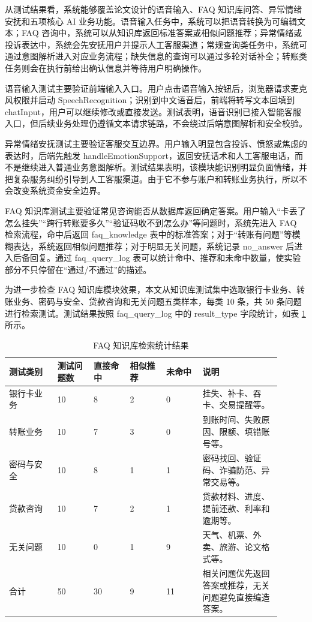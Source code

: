 \documentclass[bachelor, print]{xduthesis}
\begin{document}
从测试结果看，系统能够覆盖论文设计的语音输入、FAQ 知识库问答、异常情绪安抚和五项核心 AI 业务功能。语音输入任务中，系统可以把语音转换为可编辑文本；FAQ 咨询中，系统可以从知识库返回标准答案或相似问题推荐；异常情绪或投诉表达中，系统会先安抚用户并提示人工客服渠道；常规查询类任务中，系统可通过意图解析进入对应业务流程；缺失信息的查询可以通过多轮对话补全；转账类任务则会在执行前给出确认信息并等待用户明确操作。

语音输入测试主要验证前端输入入口。用户点击语音输入按钮后，浏览器请求麦克风权限并启动 SpeechRecognition；识别到中文语音后，前端将转写文本回填到 chatInput，用户可以继续修改或直接发送。测试表明，语音识别已接入智能客服入口，但后续业务处理仍遵循文本请求链路，不会绕过后端意图解析和安全校验。

异常情绪安抚测试主要验证客服交互边界。用户输入明显包含投诉、愤怒或焦虑的表达时，后端先触发 handleEmotionSupport，返回安抚话术和人工客服电话，而不是继续进入普通业务意图解析。测试结果表明，该模块能识别明显负面情绪，并把复杂服务纠纷引导到人工客服渠道。由于它不参与账户和转账业务执行，所以不会改变系统资金安全边界。

FAQ 知识库测试主要验证常见咨询能否从数据库返回确定答案。用户输入“卡丢了怎么挂失”“跨行转账要多久”“验证码收不到怎么办”等问题时，系统先进入 FAQ 检索流程，命中后返回 faq\_knowledge 表中的标准答案；对于“转账有问题”等模糊表达，系统返回相似问题推荐；对于明显无关问题，系统记录 no\_answer 后进入后备回复。通过 faq\_query\_log 表可以统计命中、推荐和未命中数量，使实验部分不只停留在“通过/不通过”的描述。

为进一步检查 FAQ 知识库模块效果，本文从知识库测试集中选取银行卡业务、转账业务、密码与安全、贷款咨询和无关问题五类样本，每类 10 条，共 50 条问题进行检索测试。测试结果按照 faq\_query\_log 中的 result\_type 字段统计，如表 \ref{tab:faq-knowledge-stat} 所示。

\begin{table}[H]
    \centering
    \caption{FAQ 知识库检索统计结果}
    \label{tab:faq-knowledge-stat}
    \small
    \setlength{\tabcolsep}{3pt}
    \begin{tabular}{|p{0.16\linewidth}|p{0.12\linewidth}|p{0.12\linewidth}|p{0.12\linewidth}|p{0.12\linewidth}|p{0.26\linewidth}|}
        \hline
        测试类别 & 测试问题数 & 直接命中 & 相似推荐 & 未命中 & 说明 \\
        \hline
        银行卡业务 & 10 & 8 & 2 & 0 & 挂失、补卡、吞卡、交易提醒等。 \\
        \hline
        转账业务 & 10 & 7 & 3 & 0 & 到账时间、失败原因、限额、填错账号等。 \\
        \hline
        密码与安全 & 10 & 8 & 1 & 1 & 密码找回、验证码、诈骗防范、异常交易等。 \\
        \hline
        贷款咨询 & 10 & 7 & 2 & 1 & 贷款材料、进度、提前还款、利率和逾期等。 \\
        \hline
        无关问题 & 10 & 0 & 1 & 9 & 天气、机票、外卖、旅游、论文格式等。 \\
        \hline
        合计 & 50 & 30 & 9 & 11 & 相关问题优先返回答案或推荐，无关问题避免直接编造答案。 \\
        \hline
    \end{tabular}
\end{table}
\end{document}
